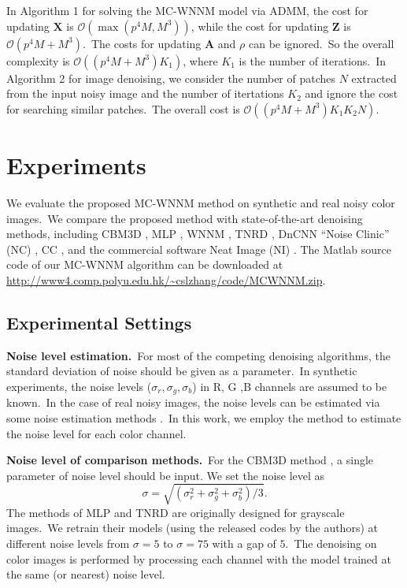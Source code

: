 In Algorithm 1 for solving the MC-WNNM model via ADMM, the cost for updating $\bm{X}$ is $\mathcal{O}(\max(p^{4}M, M^{3}))$, while the cost for updating $\bm{Z}$ is $\mathcal{O}(p^{4}M+M^{3})$.\ The costs for updating $\bm{A}$ and $\rho$ can be ignored.\ So the overall complexity is $\mathcal{O}((p^{4}M+M^{3})K_{1})$, where $K_{1}$ is the number of iterations.\ In Algorithm 2 for image denoising, we consider the number of patches $N$ extracted from the input noisy image and the number of itertations $K_{2}$ and ignore the cost for searching similar patches.\ The overall cost is $\mathcal{O}((p^{4}M+M^{3})K_{1}K_{2}N)$.

\section{Experiments}

We evaluate the proposed MC-WNNM method on synthetic and real noisy color images.\ We compare the proposed method with state-of-the-art denoising methods, including CBM3D \cite{cbm3d}, MLP \cite{mlp}, WNNM \cite{wnnm}, TNRD \cite{tnrd}, DnCNN \cite{dncnn} ``Noise Clinic'' (NC) \cite{noiseclinic,ncwebsite}, CC \cite{crosschannel2016}, and the commercial software Neat Image (NI) \cite{neatimage}. The Matlab source code of our MC-WNNM algorithm can be downloaded at \url{http://www4.comp.polyu.edu.hk/~cslzhang/code/MCWNNM.zip}.

\subsection{Experimental Settings}


\textbf{Noise level estimation.}\
For most of the competing denoising algorithms, the standard deviation of noise should be given as a parameter.\ In synthetic experiments, the noise levels ($\sigma_{r}, \sigma_{g}, \sigma_{b}$) in R, G ,B channels are assumed to be known.\ In the case of real noisy images, the noise levels can be estimated via some noise estimation methods \cite{noiselevel,Chen2015ICCV}.\ In this work, we employ the method \cite{Chen2015ICCV} to estimate the noise level for each color channel. 

\textbf{Noise level of comparison methods.}\ 
For the CBM3D method \cite{cbm3d}, a single parameter of noise level should be input. We set the noise level as
\begin{equation}
\label{equ4-21}
\sigma = \sqrt{(\sigma_{r}^{2}+\sigma_{g}^{2}+\sigma_{b}^{2})/3}.
\end{equation}
The methods of MLP \cite{mlp} and TNRD \cite{tnrd} are originally designed for grayscale images.\ We retrain their models (using the released codes by the authors) at different noise levels from $\sigma=5$ to $\sigma=75$ with a gap of $5$.\ The denoising on color images is performed by processing each channel with the model trained at the same (or nearest) noise level. 

